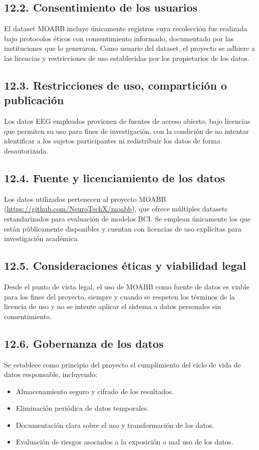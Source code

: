 \documentclass[
11pt, %
]{charter}
\begin{document}
\subsection*{12.2. Consentimiento de los usuarios}

El dataset MOABB incluye únicamente registros cuya recolección fue realizada bajo protocolos éticos con consentimiento informado, documentado por las instituciones que lo generaron. Como usuario del dataset, el proyecto se adhiere a las licencias y restricciones de uso establecidas por los propietarios de los datos.

\subsection*{12.3. Restricciones de uso, compartición o publicación}

Los datos EEG empleados provienen de fuentes de acceso abierto, bajo licencias que permiten su uso para fines de investigación, con la condición de no intentar identificar a los sujetos participantes ni redistribuir los datos de forma desautorizada.

\subsection*{12.4. Fuente y licenciamiento de los datos}

Los datos utilizados pertenecen al proyecto MOABB (\url{https://github.com/NeuroTechX/moabb}), que ofrece múltiples datasets estandarizados para evaluación de modelos BCI. Se emplean únicamente los que están públicamente disponibles y cuentan con licencias de uso explícitas para investigación académica.

\subsection*{12.5. Consideraciones éticas y viabilidad legal}

Desde el punto de vista legal, el uso de MOABB como fuente de datos es viable para los fines del proyecto, siempre y cuando se respeten los términos de la licencia de uso y no se intente aplicar el sistema a datos personales sin consentimiento.

\subsection*{12.6. Gobernanza de los datos}

Se establece como principio del proyecto el cumplimiento del ciclo de vida de datos responsable, incluyendo:
\begin{itemize}
  \item Almacenamiento seguro y cifrado de los resultados.
  \item Eliminación periódica de datos temporales.
  \item Documentación clara sobre el uso y transformación de los datos.
  \item Evaluación de riesgos asociados a la exposición o mal uso de los datos.
\end{itemize}
\end{document}
